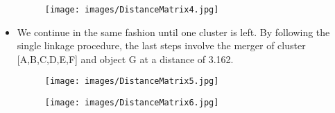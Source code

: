 \documentclass[a4paper,12pt]{article}
\begin{document}
\begin{itemize}
\begin{figure}[h!]
		\begin{center}
			\texttt{[image: images/DistanceMatrix4.jpg]}\\
		\end{center}
	\end{figure}
	\item We continue in the same fashion until one cluster is left. By following the single linkage procedure, the last steps involve the merger
	of cluster [A,B,C,D,E,F] and object G at a distance of 3.162.
	\begin{figure}[h!]
		\begin{center}
			\texttt{[image: images/DistanceMatrix5.jpg]}\\
		\end{center}
	\end{figure}
	\begin{figure}[h!]
		\begin{center}
			\texttt{[image: images/DistanceMatrix6.jpg]}\\
		\end{center}
	\end{figure}
\end{itemize}
\newpage
\end{document}
